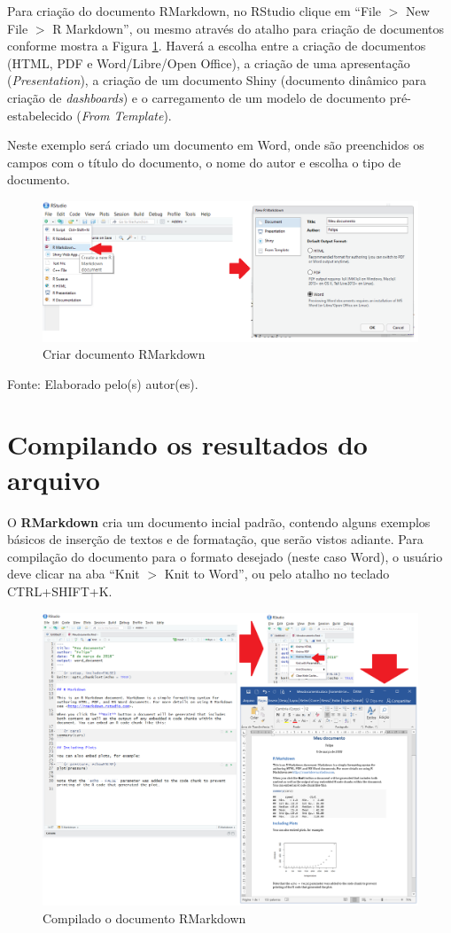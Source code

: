 \documentclass[12pt,brazil,oneside]{book}
\begin{document}
Para criação do documento RMarkdown, no RStudio clique em ``File \(>\)
New File \(>\) R Markdown'', ou mesmo através do atalho para criação de
documentos conforme mostra a Figura \ref{fig:criararq1}. Haverá a
escolha entre a criação de documentos (HTML, PDF e Word/Libre/Open
Office), a criação de uma apresentação (\emph{Presentation}), a criação
de um documento Shiny (documento dinâmico para criação de
\emph{dashboards}) e o carregamento de um modelo de documento
pré-estabelecido (\emph{From Template}).

Neste exemplo será criado um documento em Word, onde são preenchidos os
campos com o título do documento, o nome do autor e escolha o tipo de
documento.

\begin{figure}[H]

{\centering \includegraphics[width=0.6\linewidth]{criararq1} 

}

\caption{Criar documento RMarkdown}\label{fig:criararq1}
\end{figure}

Fonte: Elaborado pelo(s) autor(es).

\hypertarget{compilando-os-resultados-do-arquivo}{%
\section{Compilando os resultados do
arquivo}\label{compilando-os-resultados-do-arquivo}}

O \textbf{RMarkdown} cria um documento incial padrão, contendo alguns
exemplos básicos de inserção de textos e de formatação, que serão vistos
adiante. Para compilação do documento para o formato desejado (neste
caso Word), o usuário deve clicar na aba ``Knit \(>\) Knit to Word'', ou
pelo atalho no teclado CTRL+SHIFT+K.

\begin{figure}[H]

{\centering \includegraphics[width=0.6\linewidth]{compilar} 

}

\caption{Compilado o documento RMarkdown}\label{fig:compil}
\end{figure}
\end{document}
